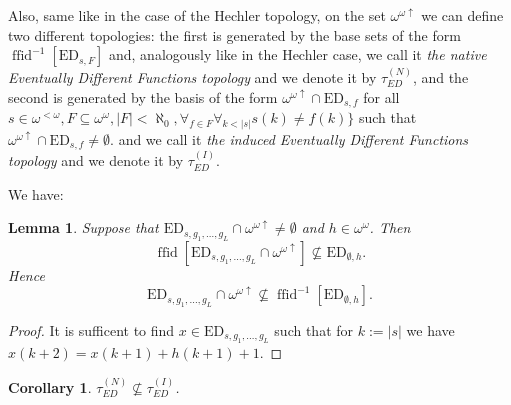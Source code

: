 \documentclass[12pt]{amsart}
\theoremstyle{plain}
\newtheorem{lemma}[theorem]{Lemma}
\newtheorem{corollary}[theorem]{Corollary}
\theoremstyle{definition}
\theoremstyle{remark}
\newcommand{\baire}{\omega^{\omega}}
\newcommand{\finbaire}{\omega^{<\omega}}
\newcommand{\incrbaire}{\omega^{\omega \uparrow}}
\newcommand{\EventuallyDifferent}[2]{\mathrm{ED}_{#1,#2}}
\newcommand{\EventuallyDifferentNative}{\tau_{\mathit{ED}}^{(N)}}
\newcommand{\EventuallyDifferentInduced}{\tau_{\mathit{ED}}^{(I)}}
\DeclareMathOperator{\ffid}{ffid}
\begin{document}
Also, same like in the case of the Hechler topology,
on the set $\incrbaire$ we can define two different topologies:
the first is generated by the base sets of the form
$\ffid^{-1}[\EventuallyDifferent{s}{F}]$
and, analogously like in the Hechler case,
we call it {\it the native Eventually Different Functions topology} and
we denote it by $\EventuallyDifferentNative$, and the second is generated by the basis
of the form $\incrbaire \cap \EventuallyDifferent{s}{f}$ for
all $s \in \finbaire, F \subseteq \baire, |F| < \aleph_0,
\forall_{f \in F} \forall_{k < |s|} s(k) \not= f(k)\rbrace$
such that $\incrbaire \cap \EventuallyDifferent{s}{f} \not= \emptyset$. 
and we call it {\it the induced Eventually Different Functions topology}
and we denote it by $\EventuallyDifferentInduced$.

We have:
\begin{lemma}
Suppose that 
$\EventuallyDifferent{s}{g_1, \ldots, g_L} \cap \incrbaire \not= \emptyset$
and $h \in \baire$. Then 
\[\ffid[\EventuallyDifferent{s}{g_1, \ldots, g_L} \cap \incrbaire] \not\subseteq
\EventuallyDifferent{\emptyset}{h}.\]
Hence 
\[\EventuallyDifferent{s}{g_1, \ldots, g_L} \cap \incrbaire \not\subseteq
\ffid^{-1}[\EventuallyDifferent{\emptyset}{h}].\]
\end{lemma}
\begin{proof}
  It is sufficent to find
  $x \in \EventuallyDifferent{s}{g_1, \ldots, g_L}$ such that
  for $k := |s|$ we have
  $x(k + 2) = x(k + 1) + h(k + 1) + 1$.
\end{proof}
\begin{corollary}
 $\EventuallyDifferentNative \not\subseteq \EventuallyDifferentInduced$.
\end{corollary}
\end{document}
